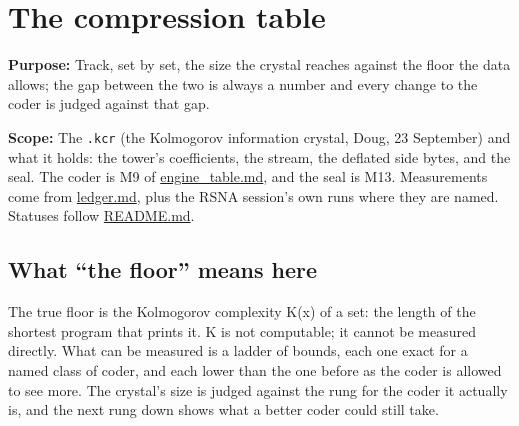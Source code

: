 \chapter{\texorpdfstring{The compression table}{The compression table}}
\label{chap:compression-table}

\textbf{Purpose:} Track, set by set, the size the crystal reaches against the floor the data allows; the gap between the two is always a number and every change to the coder is judged against that gap.

\textbf{Scope:} The \texttt{.\allowbreak{}kcr} (the Kolmogorov information crystal, Doug, 23 September) and what it holds: the tower's coefficients, the stream, the deflated side bytes, and the seal. The coder is M9 of \hyperref[chap:engine-table]{engine\_\allowbreak{}table.md}, and the seal is M13. Measurements come from \hyperref[chap:ledger]{ledger.md}, plus the RSNA session's own runs where they are named. Statuses follow \hyperref[chap:readme]{README.md}.

\section{\texorpdfstring{What “the floor” means here}{What "the floor" means here}}

The true floor is the Kolmogorov complexity K(x) of a set: the length of the shortest program that prints it. K is not computable; it cannot be measured directly. What can be measured is a ladder of bounds, each one exact for a named class of coder, and each lower than the one before as the coder is allowed to see more. The crystal's size is judged against the rung for the coder it actually is, and the next rung down shows what a better coder could still take.

